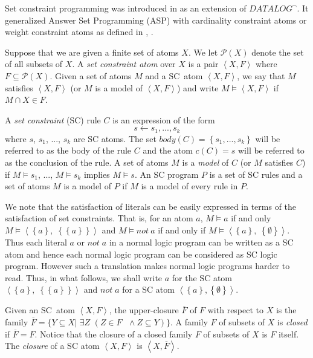 \documentclass[letterpaper]{article}\usepackage{aaai}
\begin{document}
Set constraint programming was introduced in \cite{MR} as an extension of
$DATALOG^{\lnot}$. It generalized Answer Set Programming (ASP) with
cardinality constraint atoms or weight constraint atoms as defined in
\cite{NSS99}, \cite{NS00}.

Suppose that we are given a finite set of atoms $X$. We let $\mathcal{P}\left(  X\right)  $ denote the set of all subsets of $X$. A \emph{set
constraint atom} over $X$ is a pair $\left\langle X,F\right\rangle $ where
$F\subseteq\mathcal{P}\left(  X\right)  $. Given a set of atoms $M$ and a
SC\ atom $\left\langle X,F\right\rangle $, we say that $M$ satisfies
$\left\langle X,F\right\rangle $ (or $M$ is a model of $\left\langle
X,F\right\rangle $) and write $M\models\left\langle X,F\right\rangle $ if
$M\cap X\in F$.

A \emph{set constraint} (SC) rule $C$ is an expression of the form\[
s\leftarrow s_{1},...,s_{k}\]
where $s$, $s_{1}$, ..., $s_{k}$ are SC atoms. The set $body\left(  C\right)
=\left\{  s_{1},...,s_{k}\right\}  $ will be referred to as the body of the
rule $C$ and the atom $c\left(  C\right)  =s$ will be referred to as the
conclusion of the rule. A set of atoms $M$ is a \emph{model} of $C$ (or $M$
satisfies $C$) if $M\models s_{1}$, ..., $M\models s_{k}$ implies $M\models s
$. An SC program $P$ is a set of SC rules and a set of atoms $M$ is a model of
$P$ if $M$ is a model of every rule in $P$.

We note that the satisfaction of literals can be easily expressed in terms of
the satisfaction of set constraints. That is, for an atom $a$, $M\models a $
if and only $M\models\left\langle \left\{  a\right\}  ,\;\left\{  \left\{
a\right\}  \right\}  \right\rangle $ and $M\models not\ a$ if and only if
$M\models\left\langle \left\{  a\right\}  ,\;\left\{  \emptyset\right\}
\right\rangle $. Thus each literal $a$ or $not\;a$ in a normal logic program
can be written as a SC atom and hence each normal logic program can be
considered as SC logic program. However such a translation makes normal logic
programs harder to read. Thus, in what follows, we shall write $a$ for the SC
atom $\left\langle \left\{  a\right\}  ,\;\left\{  \left\{  a\right\}
\right\}  \right\rangle $ and $not\;a$ for a SC atom $\left\langle \left\{
a\right\}  ,\left\{  \emptyset\right\}  \right\rangle $.

Given an SC\ atom $\left\langle X,F\right\rangle $, the upper-closure
$\overline{F}$ of $F$ with respect to $X$ is the family $\overline
{F}=\{Y\subseteq X|\;\exists Z$ $\left(  Z\in F\text{ }\wedge\text{
}Z\subseteq Y\right)  \}$. A family $F$ of subsets of $X$ is \emph{closed} if
$\overline{F}=F$. Notice that the closure of a closed family $F$ of subsets of
$X$ is $F$ itself. The \emph{closure} of a SC atom $\left\langle
X,F\right\rangle $ is $\left\langle X,\overline{F}\right\rangle $.
\end{document}

